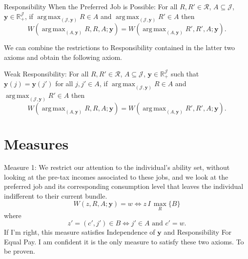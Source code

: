 \documentclass[12pt,thmsb]{article}
\DeclareMathOperator*{\argmax}{arg\,max}
\begin{document}
Responsibility When the Preferred Job is Possible: For all $R,R'\in \mathcal{R}$, $A\subseteq \mathcal{J}$, $\mathbf{y} \in \mathbb{R}_{+}^{\mathcal{J}}$, if $\argmax_{(\mathcal{J},\mathbf{y})}R\in A$ and $\argmax_{(\mathcal{J},\mathbf{y})}R'\in A$ then
\begin{equation*}
\label{ }
W(\argmax_{(A,\mathbf{y})}R,R,A;\mathbf{y})=W(\argmax_{(A,\mathbf{y})}R',R',A;\mathbf{y}).
\end{equation*}


We can combine the restrictions to Responsibility contained in the latter two axioms and obtain the following axiom.

Weak Responsibility: For all $R,R'\in \mathcal{R}$, $A\subseteq \mathcal{J}$, $\mathbf{y} \in \mathbb{R}_{+}^{\mathcal{J}}$ such that $\mathbf{y}(j)=\mathbf{y}(j')$ for all $j,j'\in A$, if $\argmax_{(\mathcal{J},\mathbf{y})}R\in A$ and $\argmax_{(\mathcal{J},\mathbf{y})}R'\in A$ then
\begin{equation*}
\label{ }
W(\argmax_{(A,\mathbf{y})}R,R,A;\mathbf{y})=W(\argmax_{(A,\mathbf{y})}R',R',A;\mathbf{y}).
\end{equation*}

\section{Measures}

Measure 1: We restrict our attention to the individual's ability set, without looking at the pre-tax incomes associated to these jobs, and we look at the preferred job and its corresponding consumption level that leaves the individual indifferent to their current bundle.
\begin{equation*}
\label{ }
W(z, R, A;\mathbf{y})=w\Leftrightarrow z\,I\,\max_R\{B\}
\end{equation*}
where
\begin{equation*}
\label{ }
z'=(c',j')\in B\Leftrightarrow j'\in A \textrm{ and } c'=w.
\end{equation*}
If I'm right, this measure satisfies Independence of $\mathbf{y}$ and Responsibility For Equal Pay. I am confident it is the only measure to satisfy these two axioms. To be proven.
\end{document}
